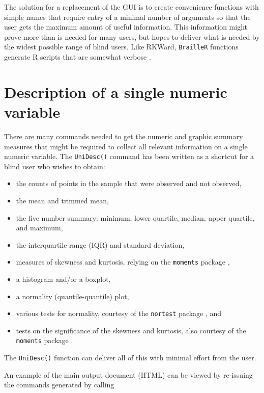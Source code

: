 \documentclass[
]{book}
\providecommand{\tightlist}{%
  \setlength{\itemsep}{0pt}\setlength{\parskip}{0pt}}
\begin{document}
The solution for a replacement of the GUI is to create convenience functions with simple names that require entry of a minimal number of arguments so that the user gets the maximum amount of useful information. This information might prove more than is needed for many users, but hopes to deliver what is needed by the widest possible range of blind users.
Like RKWard, \texttt{BrailleR} functions generate R scripts that are somewhat verbose \citep{RoedigerEtAl2012RKWard}.

\hypertarget{description-of-a-single-numeric-variable}{%
\section{Description of a single numeric variable}\label{description-of-a-single-numeric-variable}}

There are many commands needed to get the numeric and graphic summary measures that might be required to collect all relevant information on a single numeric variable. The \texttt{UniDesc()} command has been written as a shortcut for a blind user who wishes to obtain:

\begin{itemize}
\tightlist
\item
  the counts of points in the sample that were observed and not observed,
\item
  the mean and trimmed mean,
\item
  the five number summary: minimum, lower quartile, median, upper quartile, and maximum,
\item
  the interquartile range (IQR) and standard deviation,
\item
  measures of skewness and kurtosis, relying on the \texttt{moments} package \citep{Rpkg-moments},
\item
  a histogram and/or a boxplot,
\item
  a normality (quantile-quantile) plot,
\item
  various tests for normality, courtesy of the \texttt{nortest} package \citep{Rpkg-nortest} , and
\item
  tests on the significance of the skewness and kurtosis, also courtesy of the \texttt{moments} package \citep{Rpkg-moments}.
\end{itemize}

The \texttt{UniDesc()} function can deliver all of this with minimal effort from the user.

An example of the main output document (HTML) can be viewed by re-issuing the commands generated by calling
\end{document}
